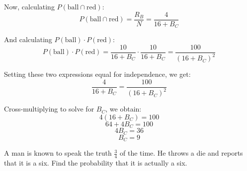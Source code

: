 \begin{solution}
Now, calculating $P(\text{ball} \cap \text{red})$:
\[
P(\text{ball} \cap \text{red}) = \frac{R_B}{N} = \frac{4}{16 + B_C}
\]

And calculating $P(\text{ball}) \cdot P(\text{red})$:
\[
P(\text{ball}) \cdot P(\text{red}) = \frac{10}{16 + B_C} \cdot \frac{10}{16 + B_C} = \frac{100}{(16 + B_C)^2}
\]

Setting these two expressions equal for independence, we get:
\[
\frac{4}{16 + B_C} = \frac{100}{(16 + B_C)^2}
\]

Cross-multiplying to solve for $B_C$, we obtain:
\[
4(16 + B_C) = 100
\]
\[
64 + 4B_C = 100
\]
\[
4B_C = 36
\]
\[
B_C = 9
\]
\end{solution}

\begin{exercise}
A man is known to speak the truth \(\frac{3}{4}\) of the time. He throws a die and reports that it is a six. Find the probability that it is actually a six.
\end{exercise}

